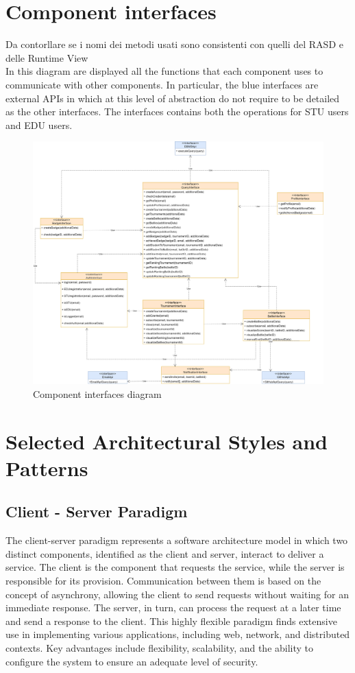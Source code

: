 \section{Component interfaces}
{\color{green} Da contorllare se i nomi dei metodi usati sono consistenti con quelli del RASD e delle Runtime View \\}
In this diagram are displayed all the functions that each component uses to communicate with other components. In particular, the blue interfaces are external APIs in which at this level of abstraction do not require to be detailed as the other interfaces. The interfaces contains both the operations for STU users and EDU users. 
\begin{figure}[H]
    \centering
    \includegraphics[width=\textwidth]{images/diagrams/ComponentInterfaces.png}
    \caption{Component interfaces diagram}
\end{figure}

\newpage

\section{Selected Architectural Styles and Patterns}
\subsection{Client - Server Paradigm}
The client-server paradigm represents a software architecture model in which two distinct components, identified as the client and server, interact to deliver a service. 
The client is the component that requests the service, while the server is responsible for its provision. 
Communication between them is based on the concept of asynchrony, allowing the client to send requests without waiting for an immediate response. 
The server, in turn, can process the request at a later time and send a response to the client. This highly flexible paradigm finds extensive use in implementing various applications, including web, network, and distributed contexts. 
Key advantages include flexibility, scalability, and the ability to configure the system to ensure an adequate level of security.

